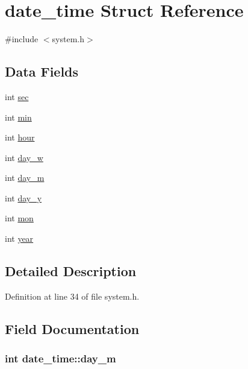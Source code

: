 \hypertarget{structdate__time}{}\section{date\+\_\+time Struct Reference}
\label{structdate__time}


{\ttfamily \#include $<$system.\+h$>$}

\subsection*{Data Fields}
\begin{DoxyCompactItemize}
\item 
int \hyperlink{structdate__time_ac43a109ccc7f3c46840afa8a30dc51f1}{sec}
\item 
int \hyperlink{structdate__time_af93fdd2e01117a0171a2583718166d2a}{min}
\item 
int \hyperlink{structdate__time_a4331b46df7b89763a85ea97a246c4ee2}{hour}
\item 
int \hyperlink{structdate__time_aa021771ff83fe860afaaf158932fcb15}{day\+\_\+w}
\item 
int \hyperlink{structdate__time_a72ee4f3a6a9970e58861c868bc676ba2}{day\+\_\+m}
\item 
int \hyperlink{structdate__time_ad89b6054376708a35bc1c0a186c808ca}{day\+\_\+y}
\item 
int \hyperlink{structdate__time_a6e8a5baa74a619330ba9925cf0baf250}{mon}
\item 
int \hyperlink{structdate__time_ae96e2e4cc09780eaac04038e12bbe06b}{year}
\end{DoxyCompactItemize}


\subsection{Detailed Description}


Definition at line 34 of file system.\+h.



\subsection{Field Documentation}
\subsubsection[{\texorpdfstring{day\+\_\+m}{day_m}}]{\setlength{\rightskip}{0pt plus 5cm}int date\+\_\+time\+::day\+\_\+m}\hypertarget{structdate__time_a72ee4f3a6a9970e58861c868bc676ba2}{}\label{structdate__time_a72ee4f3a6a9970e58861c868bc676ba2}


